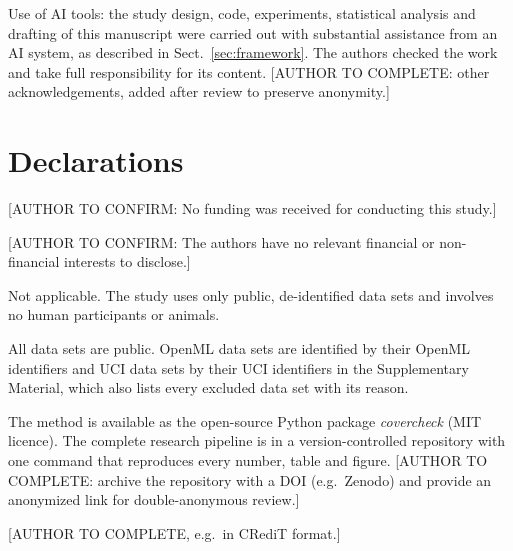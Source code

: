 Use of AI tools: the study design, code, experiments, statistical analysis and drafting of this manuscript were carried out with substantial assistance from an AI system, as described in Sect.~\ref{sec:framework}. The authors checked the work and take full responsibility for its content. [AUTHOR TO COMPLETE: other acknowledgements, added after review to preserve anonymity.]

\section*{Declarations}

 [AUTHOR TO CONFIRM: No funding was received for conducting this study.]

 [AUTHOR TO CONFIRM: The authors have no relevant financial or non-financial interests to disclose.]

 Not applicable. The study uses only public, de-identified data sets and involves no human participants or animals.

 All data sets are public. OpenML data sets are identified by their OpenML identifiers and UCI data sets by their UCI identifiers in the Supplementary Material, which also lists every excluded data set with its reason.

 The method is available as the open-source Python package \emph{covercheck} (MIT licence). The complete research pipeline is in a version-controlled repository with one command that reproduces every number, table and figure. [AUTHOR TO COMPLETE: archive the repository with a DOI (e.g.\ Zenodo) and provide an anonymized link for double-anonymous review.]

 [AUTHOR TO COMPLETE, e.g.\ in CRediT format.]
